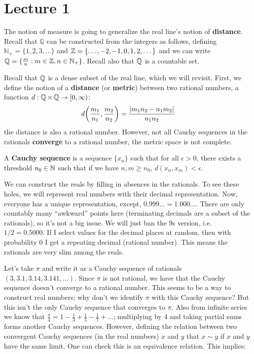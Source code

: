 \section{Lecture 1}
The notion of measure is going to generalize the real line's notion of \textbf{distance}. Recall that $\mathbb{Q}$ can be
constructed from the integers as follows, defining $\mathbb{N}_{+} = \{1, 2, 3, \dots\}$ and $\operatorname{\mathbb{Z}} = \{ \dots, -2, -1, 0, 1, 2, \dots \}$
and we can write $\operatorname{\mathbb{Q}} = \{ \frac{m}{n} : m \in \operatorname{\mathbb{Z}}, n \in \operatorname{\mathbb{N}}_{+} \}$. Recall also that $\operatorname{\mathbb{Q}}$ is a countable set.

Recall that $\operatorname{\mathbb{Q}}$ is a dense subset of the real line, which we will revisit. First, we define the notion of a \textbf{distance} (or \textbf{metric}) between two rational numbers, a function $d: \operatorname{\mathbb{Q}} \times \operatorname{\mathbb{Q}} \to [0, \infty)$:
\[ d\qty(\frac{m_1}{n_1}, \frac{m_2}{n_2}) = \frac{|m_1 n_2 - n_1 m_2|}{n_1 n_2} \]
the distance is also a rational number. However, not all Cauchy sequences in the rationals \textbf{converge} to a rational number, the metric space is not complete.
\begin{definition}
    A \textbf{Cauchy sequence} is a sequence $\{x_n\}$ such that for all $\epsilon > 0$, there exists a threshold $n_0 \in \operatorname{\mathbb{N}}$ such that 
    if we have $n, m \geq n_0$, $d(x_n, x_m) < \epsilon$.
\end{definition}
We can construct the reals by filling in absences in the rationals. To see these holes, we will represent real numbers with their decimal representation. Now, everyone has a unique representation, except, $0.999\dots = 1.000\dots$.
There are only countably many ``awkward'' points here (terminating decimals are a subset of the rationals), so it's not a big issue. We
will just ban the $9$s version, i.e. $1/2 = 0.5000$. If I select values for the decimal places at random, then with probability 0 I get a repeating decimal (rational number). This means
the rationals are very slim among the reals.

Let's take $\pi$ and write it as a Cauchy sequence of rationals $(3, 3.1, 3.14, 3.141, \dots)$. Since $\pi$ is not rational,
we have that the Cauchy sequence doesn't converge to a rational number. This seems to be a way to construct real numbers; why don't we identify $\pi$ with this Cauchy sequence?
But this isn't the only Cauchy sequence that converges to $\pi$. Also from infinite series we know that $\frac{\pi}{4} = 1 - \frac{1}{3} + \frac{1}{5} - \frac{1}{7} + \dots$;
multiplying by 4 and taking partial sums forms another Cauchy sequences. However, defining the relation between two convergent Cauchy sequences (in the real numbers) $x$ and $y$
that $x \sim y$ if $x$ and $y$ have the same limit. One can check this is an equivalence relation. This implies:

